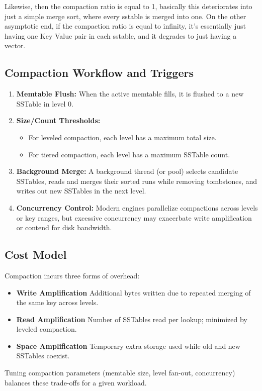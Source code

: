 \documentclass[sigconf]{acmart}
\begin{document}
      Likewise, then the compaction ratio is equal to 1, basically this deteriorates into just a simple merge sort, where every sstable is merged into one. On the other asymptotic end, if the compaction ratio is equal to infinity, it's essentially just having one Key Value pair in each sstable, and it degrades to just having a vector.

      \subsection{Compaction Workflow and Triggers}
      \begin{enumerate}
        \item \textbf{Memtable Flush:}  When the active memtable fills, it is flushed to a new SSTable in level 0.
        \item \textbf{Size/Count Thresholds:}
          \begin{itemize}
            \item For leveled compaction, each level has a maximum total size.
            \item For tiered compaction, each level has a maximum SSTable count.
          \end{itemize}
        \item \textbf{Background Merge:} A background thread (or pool) selects candidate SSTables, reads and merges their sorted runs while removing tombstones, and writes out new SSTables in the next level.
        \item \textbf{Concurrency Control:} Modern engines parallelize compactions across levels or key ranges, but excessive concurrency may exacerbate write amplification or contend for disk bandwidth.
      \end{enumerate}

      \subsection{Cost Model}
      Compaction incurs three forms of overhead:
      \begin{itemize}
        \item \textbf{Write Amplification}
          Additional bytes written due to repeated merging of the same key across levels.
        \item \textbf{Read Amplification}
          Number of SSTables read per lookup; minimized by leveled compaction.
        \item \textbf{Space Amplification}
          Temporary extra storage used while old and new SSTables coexist.
      \end{itemize}
      Tuning compaction parameters (memtable size, level fan-out, concurrency) balances these trade-offs for a given workload.
\end{document}
